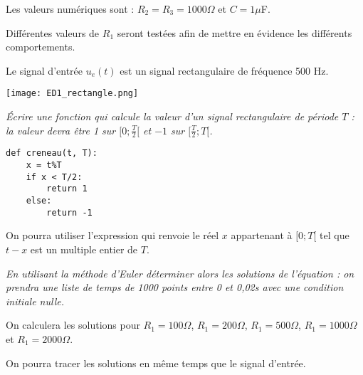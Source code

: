\medskip

Les valeurs numériques sont  : $R_2=R_3= 1000 \Omega$ et $C = 1 \mu $F.

Différentes valeurs de $R_1$ seront testées afin de mettre en évidence les différents comportements.

Le signal d'entrée $u_e(t)$ est un signal rectangulaire de fréquence 500 Hz.
\begin{center}
\texttt{[image: ED1\_rectangle.png]}
\end{center}
\begin{Exercise}\it
Écrire une fonction  qui calcule la valeur d'un signal rectangulaire de période $T$ : la valeur devra être 1 sur $[0;\frac T2[$ et $-1$ sur $[\frac T2;T[$.

\end{Exercise}
\begin{Answer}
\begin{lstlisting}
def creneau(t, T):
    x = t%T
    if x < T/2:
        return 1
    else:
        return -1
\end{lstlisting}
\newpage
\end{Answer}
On pourra utiliser l'expression  qui renvoie le réel $x$ appartenant à $[0;T[$ tel que $t-x$ est un multiple entier de $T$.
\begin{Exercise}\it
En utilisant la méthode d'Euler déterminer alors les solutions de l'équation : on prendra une liste de temps de 1000 points entre 0 et 0,02s avec une condition initiale nulle. 

On calculera les solutions pour $R_1=100\Omega$, $R_1=200\Omega$, $R_1=500\Omega$, $R_1=1000\Omega$ et $R_1=2000\Omega$. 

On pourra tracer les solutions en même temps que le signal d'entrée.
\end{Exercise}
